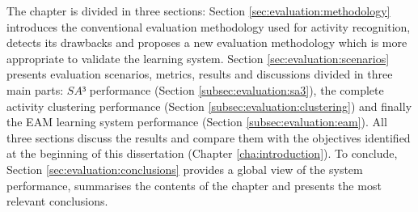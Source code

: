The chapter is divided in three sections: Section \ref{sec:evaluation:methodology} introduces the conventional evaluation methodology used for activity recognition, detects its drawbacks and proposes a new evaluation methodology which is more appropriate to validate the learning system. Section \ref{sec:evaluation:scenarios} presents evaluation scenarios, metrics, results and discussions divided in three main parts: $SA³$ performance (Section \ref{subsec:evaluation:sa3}), the complete activity clustering performance (Section \ref{subsec:evaluation:clustering}) and finally the EAM learning system performance (Section \ref{subsec:evaluation:eam}). All three sections discuss the results and compare them with the objectives identified at the beginning of this dissertation (Chapter \ref{cha:introduction}). To conclude, Section \ref{sec:evaluation:conclusions} provides a global view of the system performance, summarises the contents of the chapter and presents the most relevant conclusions.